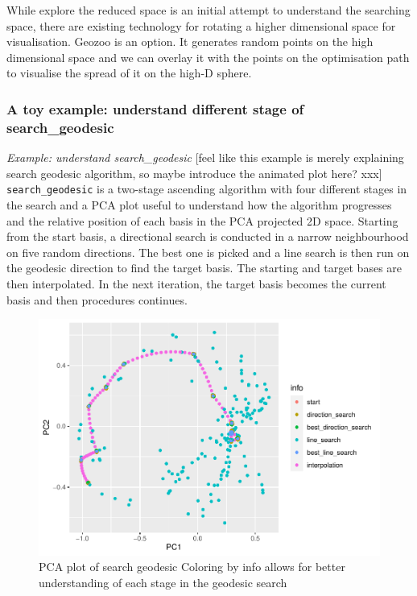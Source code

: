 \documentclass[12pt]{article}
\begin{document}
While explore the reduced space is an initial attempt to understand the
searching space, there are existing technology for rotating a higher
dimensional space for visualisation. Geozoo is an option. It generates
random points on the high dimensional space and we can overlay it with
the points on the optimisation path to visualise the spread of it on the
high-D sphere.

\hypertarget{a-toy-example-understand-different-stage-of-search_geodesic}{%
\subsubsection{A toy example: understand different stage of
search\_geodesic}\label{a-toy-example-understand-different-stage-of-search_geodesic}}

\emph{Example: understand search\_geodesic} {[}feel like this example is
merely explaining search geodesic algorithm, so maybe introduce the
animated plot here? xxx{]} \texttt{search\_geodesic} is a two-stage
ascending algorithm with four different stages in the search and a PCA
plot useful to understand how the algorithm progresses and the relative
position of each basis in the PCA projected 2D space. Starting from the
start basis, a directional search is conducted in a narrow neighbourhood
on five random directions. The best one is picked and a line search is
then run on the geodesic direction to find the target basis. The
starting and target bases are then interpolated. In the next iteration,
the target basis becomes the current basis and then procedures
continues.

\begin{figure}
\centering
\includegraphics{paper_files/figure-latex/pca-1.pdf}
\caption{\label{pca}PCA plot of search geodesic Coloring by info allows
for better understanding of each stage in the geodesic search}
\end{figure}
\end{document}
